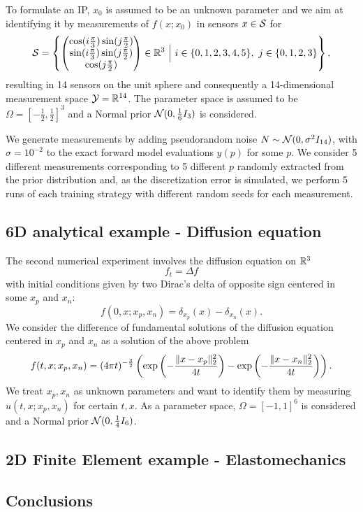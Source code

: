 To formulate an IP, $x_0$ is assumed to be an unknown parameter and we aim at identifying it by measurements of $f(x;x_0)$ in sensors $x \in \mathcal S$ for 
\[
    \mathcal S = \left\{
        \begin{pmatrix}
            \cos( i \frac{\pi}{3}) \sin( j \frac{\pi}{2}) \\
            \sin( i \frac{\pi}{3}) \sin( j \frac{\pi}{2}) \\ 
            \cos( j \frac{\pi}{2})
        \end{pmatrix} 
        \in \mathbb{R}^3 \ \Big| \ i \in \{0,1,2,3,4,5\}, \ j \in \{0,1,2,3\}
     \right\},
\]
resulting in 14 sensors on the unit sphere and consequently a 14-dimensional measurement space $\mathcal Y = \mathbb{R}^{14}$. \newline
The parameter space is assumed to be $\Omega = \left[-\frac{1}{2}, \frac{1}{2}\right]^3$ and a Normal prior $\mathcal N (0, \frac{1}{6}I_3)$ is considered. \medskip

We generate measurements by adding pseudorandom noise $N \sim \mathcal N (0, \sigma^2 I_{14})$, with $\sigma = 10^{-2}$ to the exact forward model evaluations $y(p)$ for some $p$. 
We consider 5 different measurements corresponding to 5 different $p$ randomly extracted from the prior distribution and, as the discretization error is simulated, we perform 5 runs of each training strategy with different random seeds for each measurement.
\medskip


\subsection{6D analytical example - Diffusion equation}\label{sec:6dexp}

The second numerical experiment involves the diffusion equation on $\mathbb{R}^3$
\[
f_t = \Delta f
\]
with initial conditions given by two Dirac's delta of opposite sign centered in some $x_p$ and $x_n$:
\[
f (0,x; x_p, x_n) = \delta_{x_p}(x) - \delta_{x_n}(x).
\]
We consider the difference of fundamental solutions of the diffusion equation centered in $x_p$ and $x_n$ as a solution of the above problem
\[
f(t,x; x_p, x_n) = (4 \pi t)^{-\frac{3}{2}} \left( \exp \left( - \frac{\lVert x-x_p\rVert_2^2}{4t}\right)- \exp \left( - \frac{\lVert x-x_n\rVert_2^2}{4t}\right) \right).
\]
We treat $x_p, x_n$ as unknown parameters and want to identify them by measuring $u(t,x;x_p, x_n)$ for certain $t,x$. As a parameter space, $\Omega = [-1,1]^6$ is considered and a Normal prior $\mathcal N (0, \frac{1}{4}I_6)$.

\subsection{2D Finite Element example - Elastomechanics}\label{sec:FEexp}



\subsection{Conclusions}\label{sec:concl}
